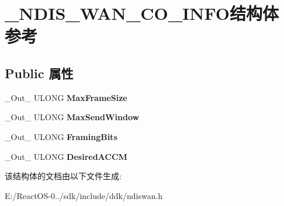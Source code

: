 \hypertarget{struct___n_d_i_s___w_a_n___c_o___i_n_f_o}{}\section{\+\_\+\+N\+D\+I\+S\+\_\+\+W\+A\+N\+\_\+\+C\+O\+\_\+\+I\+N\+F\+O结构体 参考}
\label{struct___n_d_i_s___w_a_n___c_o___i_n_f_o}
\subsection*{Public 属性}
\begin{DoxyCompactItemize}
\item 
\mbox{\label{struct___n_d_i_s___w_a_n___c_o___i_n_f_o_a70e43877079e458ca7c8d21c4ef49b00}} 
\+\_\+\+Out\+\_\+ U\+L\+O\+NG {\bfseries Max\+Frame\+Size}
\item 
\mbox{\label{struct___n_d_i_s___w_a_n___c_o___i_n_f_o_ae7aa427f9c665934403f5155228773d6}} 
\+\_\+\+Out\+\_\+ U\+L\+O\+NG {\bfseries Max\+Send\+Window}
\item 
\mbox{\label{struct___n_d_i_s___w_a_n___c_o___i_n_f_o_ab904bb01bc979d00559010328f9da2f0}} 
\+\_\+\+Out\+\_\+ U\+L\+O\+NG {\bfseries Framing\+Bits}
\item 
\mbox{\label{struct___n_d_i_s___w_a_n___c_o___i_n_f_o_aaad1a32029816f3a9f9734efa0e2db58}} 
\+\_\+\+Out\+\_\+ U\+L\+O\+NG {\bfseries Desired\+A\+C\+CM}
\end{DoxyCompactItemize}


该结构体的文档由以下文件生成\+:\begin{DoxyCompactItemize}
\item 
E\+:/\+React\+O\+S-\/0../sdk/include/ddk/ndiswan.\+h\end{DoxyCompactItemize}
